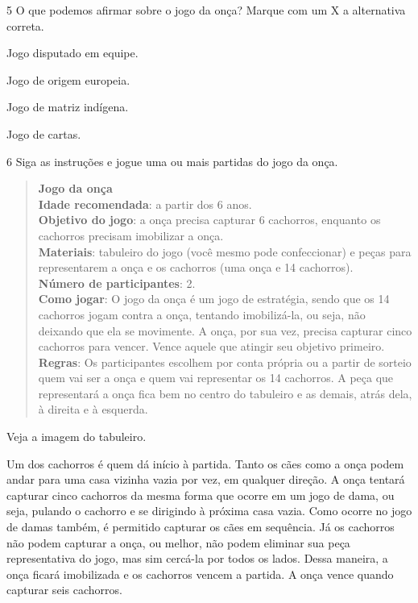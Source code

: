 \num{5} O que podemos afirmar sobre o jogo da onça? Marque com um X a alternativa correta.

\begin{boxlist}
 Jogo disputado em equipe.

 Jogo de origem europeia.

 Jogo de matriz indígena.

 Jogo de cartas.
\end{boxlist}



\num{6} Siga as instruções e jogue uma ou mais partidas do jogo da onça.

\begin{quote}
\textbf{Jogo da onça}\\
\textbf{Idade recomendada}: a partir dos 6 anos.\\
\textbf{Objetivo do jogo}: a onça precisa capturar 6 cachorros, enquanto
os cachorros precisam imobilizar a onça.\\
\textbf{Materiais}: tabuleiro do jogo (você mesmo pode confeccionar) e
peças para representarem a onça e os cachorros (uma onça e 14
cachorros).\\
\textbf{Número de participantes}: 2.\\
\textbf{Como jogar}: O jogo da onça é um jogo de estratégia, sendo que
os 14 cachorros jogam contra a onça, tentando imobilizá-la, ou seja, não
deixando que ela se movimente. A onça, por sua vez, precisa capturar
cinco cachorros para vencer. Vence aquele que atingir seu objetivo
primeiro.\\
\textbf{Regras}: Os participantes escolhem por conta própria ou a partir
de sorteio quem vai ser a onça e quem vai representar os 14 cachorros. A
peça que representará a onça fica bem no centro do tabuleiro e as
demais, atrás dela, à direita e à esquerda.
\end{quote}

Veja a imagem do tabuleiro.


Um dos cachorros é quem dá início à partida. Tanto os cães como a onça
podem andar para uma casa vizinha vazia por vez, em qualquer direção. A
onça tentará capturar cinco cachorros da mesma forma que ocorre em um
jogo de dama, ou seja, pulando o cachorro e se dirigindo à próxima casa
vazia. Como ocorre no jogo de damas também, é permitido capturar os
cães em sequência. Já os cachorros não podem capturar a onça, ou melhor,
não podem eliminar sua peça representativa do jogo, mas sim cercá-la por
todos os lados. Dessa maneira, a onça ficará imobilizada e os cachorros
vencem a partida. A onça vence quando capturar seis cachorros.

